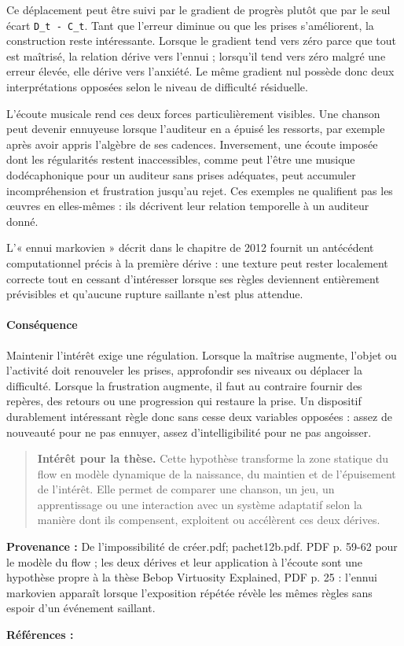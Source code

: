 \documentclass[10pt,a4paper]{article}
\begin{document}
Ce déplacement peut être suivi par le gradient de progrès plutôt que par le seul écart \texttt{D\_t - C\_t}. Tant que l'erreur diminue ou que les prises s'améliorent, la construction reste intéressante. Lorsque le gradient tend vers zéro parce que tout est maîtrisé, la relation dérive vers l'ennui ; lorsqu'il tend vers zéro malgré une erreur élevée, elle dérive vers l'anxiété. Le même gradient nul possède donc deux interprétations opposées selon le niveau de difficulté résiduelle.

L'écoute musicale rend ces deux forces particulièrement visibles. Une chanson peut devenir ennuyeuse lorsque l'auditeur en a épuisé les ressorts, par exemple après avoir appris l'algèbre de ses cadences. Inversement, une écoute imposée dont les régularités restent inaccessibles, comme peut l'être une musique dodécaphonique pour un auditeur sans prises adéquates, peut accumuler incompréhension et frustration jusqu'au rejet. Ces exemples ne qualifient pas les œuvres en elles-mêmes : ils décrivent leur relation temporelle à un auditeur donné.

L'« ennui markovien » décrit dans le chapitre de 2012 fournit un antécédent computationnel précis à la première dérive : une texture peut rester localement correcte tout en cessant d'intéresser lorsque ses règles deviennent entièrement prévisibles et qu'aucune rupture saillante n'est plus attendue.

\paragraph{Conséquence}
Maintenir l'intérêt exige une régulation. Lorsque la maîtrise augmente, l'objet ou l'activité doit renouveler les prises, approfondir ses niveaux ou déplacer la difficulté. Lorsque la frustration augmente, il faut au contraire fournir des repères, des retours ou une progression qui restaure la prise. Un dispositif durablement intéressant règle donc sans cesse deux variables opposées : assez de nouveauté pour ne pas ennuyer, assez d'intelligibilité pour ne pas angoisser.

\begin{quote}
\textbf{Intérêt pour la thèse.} Cette hypothèse transforme la zone statique du flow en modèle dynamique de la naissance, du maintien et de l'épuisement de l'intérêt. Elle permet de comparer une chanson, un jeu, un apprentissage ou une interaction avec un système adaptatif selon la manière dont ils compensent, exploitent ou accélèrent ces deux dérives.
\end{quote}
{\footnotesize\color{metadata}\textbf{Provenance :} De l'impossibilité de créer.pdf; pachet12b.pdf. PDF p. 59-62 pour le modèle du flow ; les deux dérives et leur application à l'écoute sont une hypothèse propre à la thèse Bebop Virtuosity Explained, PDF p. 25 : l'ennui markovien apparaît lorsque l'exposition répétée révèle les mêmes règles sans espoir d'un événement saillant.\par}
{\footnotesize\color{metadata}\textbf{Références :} \parencite{pachet2012virtuosity}\par}
\end{document}
